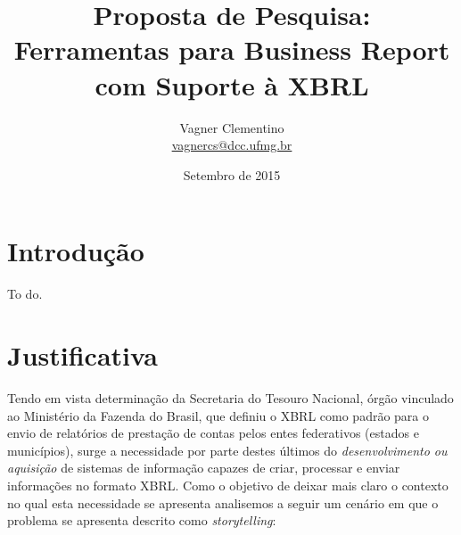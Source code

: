 \documentclass{article}
\title{Proposta de Pesquisa: \\
Ferramentas para Business Report com Suporte à XBRL
}
\author{Vagner Clementino \\ 
       \url{vagnercs@dcc.ufmg.br}}
\date{Setembro de  2015}
\begin{document}
\maketitle

\section{Introdução}
\label{sec:intro}

To do.

\section{Justificativa}
\label{sec:contexto}

Tendo em vista determinação da Secretaria do Tesouro Nacional, órgão
vinculado ao  Ministério da Fazenda do Brasil, que definiu o XBRL como
padrão para o envio de relatórios de prestação de contas pelos entes
federativos (estados e municípios), surge a necessidade por parte
destes últimos do \textit{desenvolvimento ou aquisição} de sistemas de
informação capazes de criar, processar e enviar informações no formato
XBRL. Como o objetivo de deixar mais claro o contexto no qual esta
necessidade se apresenta analisemos a seguir um cenário em que o
problema se apresenta descrito como \textit{storytelling}:
\\
\\
\end{document}

